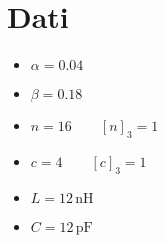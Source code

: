 \section*{Dati}
\begin{itemize}
    \item $\alpha = 0.04$
    \item $\beta = 0.18$
    \item $n = 16 \qquad [n]_3 = 1$
    \item $c = 4 \qquad [c]_3 = 1$
    \item $L = 12\,\textrm{nH}$
    \item $C = 12\,\textrm{pF}$
\end{itemize}
